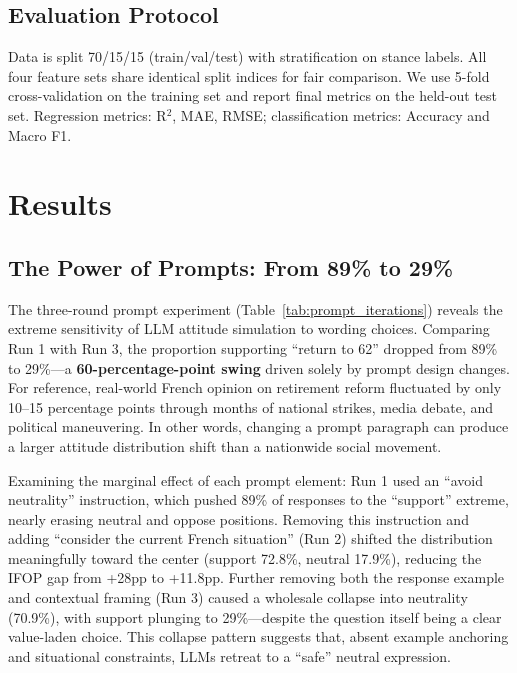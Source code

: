 \documentclass[11pt,a4paper]{article}
\begin{document}
\subsection{Evaluation Protocol}

Data is split 70/15/15 (train/val/test) with stratification on stance labels. All four feature sets share identical split indices for fair comparison. We use 5-fold cross-validation on the training set and report final metrics on the held-out test set. Regression metrics: R$^2$, MAE, RMSE; classification metrics: Accuracy and Macro F1.

\section{Results}

\subsection{The Power of Prompts: From 89\% to 29\%}

The three-round prompt experiment (Table~\ref{tab:prompt_iterations}) reveals the extreme sensitivity of LLM attitude simulation to wording choices. Comparing Run 1 with Run 3, the proportion supporting ``return to 62'' dropped from 89\% to 29\%---a \textbf{60-percentage-point swing} driven solely by prompt design changes. For reference, real-world French opinion on retirement reform fluctuated by only 10--15 percentage points through months of national strikes, media debate, and political maneuvering. In other words, changing a prompt paragraph can produce a larger attitude distribution shift than a nationwide social movement.

Examining the marginal effect of each prompt element: Run 1 used an ``avoid neutrality'' instruction, which pushed 89\% of responses to the ``support'' extreme, nearly erasing neutral and oppose positions. Removing this instruction and adding ``consider the current French situation'' (Run 2) shifted the distribution meaningfully toward the center (support 72.8\%, neutral 17.9\%), reducing the IFOP gap from +28pp to +11.8pp. Further removing both the response example and contextual framing (Run 3) caused a wholesale collapse into neutrality (70.9\%), with support plunging to 29\%---despite the question itself being a clear value-laden choice. This collapse pattern suggests that, absent example anchoring and situational constraints, LLMs retreat to a ``safe'' neutral expression.
\end{document}
